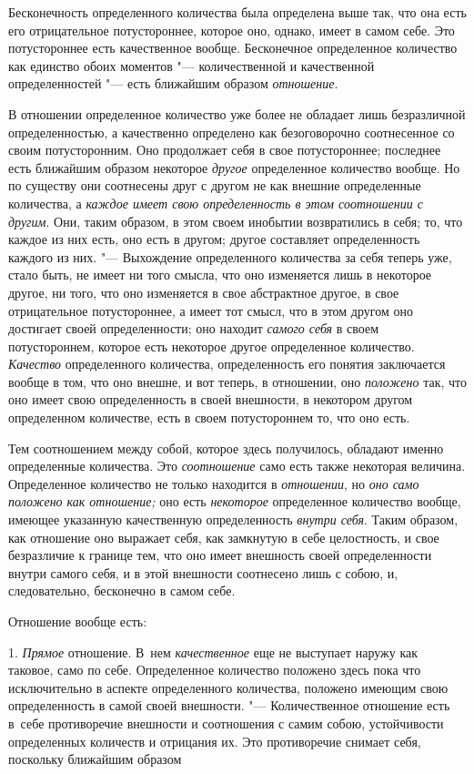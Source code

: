 Бесконечность определенного количества была определена выше так, что она
есть его отрицательное потустороннее, которое оно, однако, имеет в самом
себе. Это потустороннее есть качественное вообще. Бесконечное определенное
количество как единство обоих моментов "--- количественной и качественной
определенностей "--- есть ближайшим образом {\em отношение}.

В отношении определенное количество уже более не обладает лишь безразличной
определенностью, а качественно определено как безоговорочно соотнесенное со
своим потусторонним. Оно продолжает себя в свое потустороннее; последнее есть
ближайшим образом некоторое {\em другое} определенное количество вообще. Но по
существу они соотнесены друг с другом не как внешние определенные количества, а
{\em каждое имеет свою определенность в этом соотношении с другим}. Они, таким
образом, в этом своем инобытии возвратились в себя; то, что каждое из них есть,
оно есть в другом; другое составляет определенность каждого из них. "---
Выхождение определенного количества за себя теперь уже, стало быть, не имеет ни
того смысла, что оно изменяется лишь в некоторое другое, ни того, что оно
изменяется в свое абстрактное другое, в свое отрицательное потустороннее, а
имеет тот смысл, что в этом другом оно достигает своей определенности; оно
находит {\em самого себя} в своем потустороннем, которое есть некоторое другое
определенное количество. {\em Качество} определенного количества,
определенность его понятия заключается вообще в том, что оно внешне, и вот
теперь, в отношении, оно {\em положено} так, что оно имеет свою определенность
в своей внешности, в некотором другом определенном количестве, есть в своем
потустороннем то, что оно есть.

Тем соотношением между собой, которое здесь получилось, обладают именно
определенные количества. Это {\em соотношение} само есть также некоторая
величина. Определенное количество не только находится в {\em отношении}, но
{\em оно само положено как отношение;} оно есть {\em некоторое} определенное
количество вообще, имеющее указанную качественную определенность
{\em внутри себя}. Таким образом, как отношение оно выражает себя, как
замкнутую в себе целостность, и свое безразличие к границе тем, что оно имеет
внешность своей определенности внутри самого себя, и в этой внешности
соотнесено лишь с собою, и, следовательно, бесконечно в самом себе.

Отношение вообще есть:

1. {\em Прямое} отношение. В~нем {\em качественное} еще не выступает наружу как
таковое, само по себе. Определенное количество положено здесь пока что
исключительно в аспекте определенного количества, положено имеющим свою
определенность в самой своей внешности. "--- Количественное отношение есть
в~себе противоречие внешности и соотношения с самим собою, устойчивости
определенных количеств и отрицания их. Это противоречие снимает себя, поскольку
ближайшим образом

